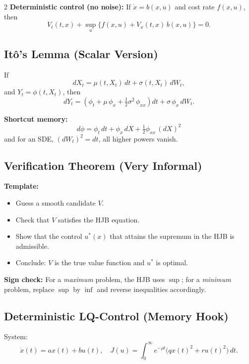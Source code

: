 \documentclass[12pt]{article}
\begin{document}
\begin{multicols}{2}
\noindent\textbf{Deterministic control (no noise):}
If $\dot{x} = b(x,u)$ and cost rate $f(x,u)$, then
\[
V_t(t,x)
+ \sup_{u}
\bigl\{ f(x,u) + V_x(t,x)\,b(x,u)\bigr\}
= 0.
\]

\subsection*{It\^o’s Lemma (Scalar Version)}

\noindent If
\[
dX_t = \mu(t,X_t)\,dt + \sigma(t,X_t)\,dW_t,
\]
and $Y_t = \phi(t,X_t)$, then
\[
dY_t
= \left(
    \phi_t
    + \mu\,\phi_x
    + \tfrac12 \sigma^2\,\phi_{xx}
  \right)\!dt
+ \sigma\,\phi_x\,dW_t.
\]

\noindent\textbf{Shortcut memory:}
\[
\boxed{
d\phi = \phi_t\,dt + \phi_x\,dX + \tfrac12 \phi_{xx}\,(dX)^2
}
\]
and for an SDE, $(dW_t)^2 = dt$, all higher powers vanish.

\subsection*{Verification Theorem (Very Informal)}

\noindent\textbf{Template:}
\begin{itemize}[noitemsep,leftmargin=*]
  \item Guess a smooth candidate $V$.
  \item Check that $V$ satisfies the HJB equation.
  \item Show that the control $u^\ast(x)$ that attains the supremum in the HJB
        is admissible.
  \item Conclude: $V$ is the true value function and $u^\ast$ is optimal.
\end{itemize}

\noindent\textbf{Sign check:} For a \emph{maximum} problem, the HJB uses
\(\sup\); for a \emph{minimum} problem, replace \(\sup\) by \(\inf\) and
reverse inequalities accordingly.

\subsection*{Deterministic LQ-Control (Memory Hook)}

\noindent System:
\[
\dot{x}(t) = a x(t) + b u(t),
\quad
J(u) = \int_0^\infty e^{-\rho t}
\bigl( q x(t)^2 + r u(t)^2 \bigr)\,dt.
\]


\end{multicols}
\end{document}
